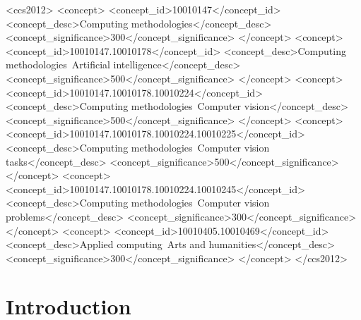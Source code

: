 \documentclass[acmlarge]{acmart}
\begin{document}
\begin{CCSXML}
<ccs2012>
   <concept>
       <concept_id>10010147</concept_id>
       <concept_desc>Computing methodologies</concept_desc>
       <concept_significance>300</concept_significance>
       </concept>
   <concept>
       <concept_id>10010147.10010178</concept_id>
       <concept_desc>Computing methodologies~Artificial intelligence</concept_desc>
       <concept_significance>500</concept_significance>
       </concept>
   <concept>
       <concept_id>10010147.10010178.10010224</concept_id>
       <concept_desc>Computing methodologies~Computer vision</concept_desc>
       <concept_significance>500</concept_significance>
       </concept>
   <concept>
       <concept_id>10010147.10010178.10010224.10010225</concept_id>
       <concept_desc>Computing methodologies~Computer vision tasks</concept_desc>
       <concept_significance>500</concept_significance>
       </concept>
   <concept>
       <concept_id>10010147.10010178.10010224.10010245</concept_id>
       <concept_desc>Computing methodologies~Computer vision problems</concept_desc>
       <concept_significance>300</concept_significance>
       </concept>
   <concept>
       <concept_id>10010405.10010469</concept_id>
       <concept_desc>Applied computing~Arts and humanities</concept_desc>
       <concept_significance>300</concept_significance>
       </concept>
 </ccs2012>
\end{CCSXML}




\maketitle

\section{Introduction}\label{sec:intro}
\end{document}
